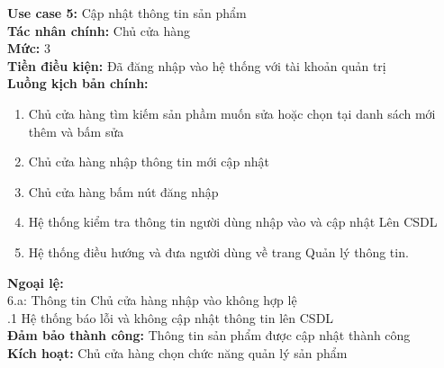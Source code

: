 \begin{boxed}
	\textbf{Use case 5:} Cập nhật thông tin sản phẩm                          \\
	\textbf{Tác nhân chính:} Chủ cửa hàng                                     \\
	\textbf{Mức:} 3                                                           \\
	\textbf{Tiền điều kiện:} Đã đăng nhập vào hệ thống với tài khoản quản trị \\
	\textbf{Luồng kịch bản chính:}                                            \\
	\begin{enumerate}
		\vspace{-2em}
		\itemsep-0.5em
		\item Chủ cửa hàng tìm kiếm sản phầm muốn sửa hoặc chọn tại danh sách mới thêm và bấm sửa
		\item Chủ cửa hàng nhập thông tin mới cập nhật
		\item Chủ cửa hàng bấm nút đăng nhập
		\item Hệ thống kiểm tra thông tin người dùng nhập vào và cập nhật Lên CSDL
		\item Hệ thống điều hướng và đưa người dùng về trang Quản lý thông tin.
		      \vspace{-1em}
	\end{enumerate}
	\textbf{Ngoại lệ:}                                                        \\
	\hspace{1em}6.a: Thông tin Chủ cửa hàng nhập vào không hợp lệ             \\
	\hspace{2.5em}.1 Hệ thống báo lỗi và không cập nhật thông tin lên CSDL    \\
	\textbf{Đảm bảo thành công:} Thông tin sản phẩm được cập nhật thành công  \\
	\textbf{Kích hoạt:} Chủ cửa hàng chọn chức năng quản lý sản phẩm
\end{boxed}
\newpage
